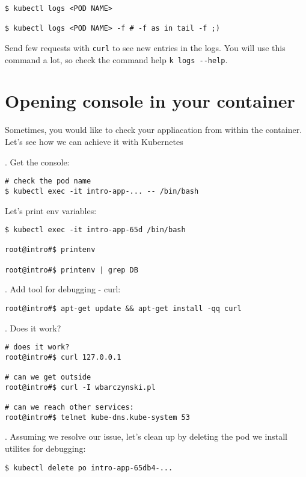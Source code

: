 \documentclass[12pt, letterpaper]{article}
\begin{document}
\begin{verbatim}
$ kubectl logs <POD NAME>

$ kubectl logs <POD NAME> -f # -f as in tail -f ;)
\end{verbatim}

Send few requests with \verb|curl| to see new entries in the logs. You will use this command a lot, so check the command help \verb|k logs --help|.

\pagebreak
\section{Opening console in your container}

Sometimes, you would like to check your appliacation from within the container. Let's see how we can achieve it with Kubernetes

. Get the console:

\begin{verbatim}
# check the pod name
$ kubectl exec -it intro-app-... -- /bin/bash
\end{verbatim}

Let's print env variables:

\begin{verbatim}
$ kubectl exec -it intro-app-65d /bin/bash

root@intro#$ printenv

root@intro#$ printenv | grep DB
\end{verbatim}

. Add tool for debugging - curl:

\begin{verbatim}
root@intro#$ apt-get update && apt-get install -qq curl
\end{verbatim}

. Does it work?

\begin{verbatim}
# does it work?
root@intro#$ curl 127.0.0.1

# can we get outside
root@intro#$ curl -I wbarczynski.pl

# can we reach other services:
root@intro#$ telnet kube-dns.kube-system 53
\end{verbatim}

. Assuming we resolve our issue, let's clean up by deleting the pod we install utilites for debugging:

\begin{verbatim}
$ kubectl delete po intro-app-65db4-...
\end{verbatim}
%
%
%
\pagebreak
\end{document}
